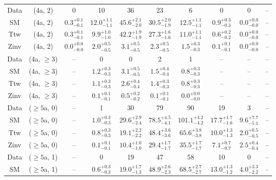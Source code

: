 \begin{table}[h!]
{\begin{tabular}{cccccccccc}
	Data & (4a, 2) & 0 & 10 & 36 & 23 & 6 & 0 & 0 & -- \\[0.5ex] 
	SM & (4a, 2) & $0.3^{+ 0.1 }_{- 0.1 }$ & $12.0^{+ 1.1 }_{- 1.1 }$ & $45.6^{+ 2.1 }_{- 2.0 }$ & $30.5^{+ 2.0 }_{- 1.9 }$ & $12.5^{+ 1.1 }_{- 1.1 }$ & $0.9^{+ 0.3 }_{- 0.3 }$ & $0.0^{+ 0.0 }_{- 0.0 }$ & -- \\[0.5ex] 
	Ttw & (4a, 2) & $0.3^{+ 0.1 }_{- 0.1 }$ & $9.9^{+ 1.0 }_{- 1.0 }$ & $42.2^{+ 1.9 }_{- 1.9 }$ & $27.3^{+ 1.6 }_{- 1.6 }$ & $11.0^{+ 1.1 }_{- 1.1 }$ & $0.6^{+ 0.2 }_{- 0.2 }$ & $0.0^{+ 0.0 }_{- 0.0 }$ & -- \\[0.5ex] 
	Zinv & (4a, 2) & $0.0^{+ 0.0 }_{- 0.0 }$ & $2.0^{+ 0.5 }_{- 0.5 }$ & $3.1^{+ 0.5 }_{- 0.5 }$ & $2.3^{+ 0.5 }_{- 0.5 }$ & $1.5^{+ 0.3 }_{- 0.3 }$ & $0.1^{+ 0.1 }_{- 0.1 }$ & $0.0^{+ 0.0 }_{- 0.0 }$ & -- \\[0.5ex] 
	Data & (4a, $\ge3$) & -- & 0 & 0 & 2 & 1 & -- & -- & -- \\[0.5ex] 
	SM & (4a, $\ge3$) & -- & $1.2^{+ 0.3 }_{- 0.3 }$ & $3.1^{+ 0.5 }_{- 0.5 }$ & $1.5^{+ 0.4 }_{- 0.4 }$ & $0.8^{+ 0.3 }_{- 0.3 }$ & -- & -- & -- \\[0.5ex] 
	Ttw & (4a, $\ge3$) & -- & $1.1^{+ 0.3 }_{- 0.3 }$ & $2.6^{+ 0.4 }_{- 0.4 }$ & $1.4^{+ 0.3 }_{- 0.3 }$ & $0.8^{+ 0.3 }_{- 0.3 }$ & -- & -- & -- \\[0.5ex] 
	Zinv & (4a, $\ge3$) & -- & $0.1^{+ 0.1 }_{- 0.1 }$ & $0.5^{+ 0.2 }_{- 0.2 }$ & $0.1^{+ 0.1 }_{- 0.1 }$ & $0.0^{+ 0.0 }_{- 0.0 }$ & -- & -- & -- \\[0.5ex] 
	Data & ($\ge5$a, 0) & -- & 1 & 30 & 79 & 90 & 19 & 3 & -- \\[0.5ex] 
	SM & ($\ge5$a, 0) & -- & $1.0^{+ 0.3 }_{- 0.3 }$ & $29.6^{+ 2.9 }_{- 2.4 }$ & $78.5^{+ 4.5 }_{- 4.1 }$ & $101.1^{+ 4.2 }_{- 4.2 }$ & $17.7^{+ 1.7 }_{- 1.6 }$ & $9.6^{+ 7.7 }_{- 5.1 }$ & -- \\[0.5ex] 
	Ttw & ($\ge5$a, 0) & -- & $0.8^{+ 0.3 }_{- 0.3 }$ & $19.1^{+ 2.2 }_{- 2.2 }$ & $48.4^{+ 3.6 }_{- 3.6 }$ & $65.6^{+ 3.8 }_{- 3.8 }$ & $10.0^{+ 1.3 }_{- 1.3 }$ & $2.0^{+ 0.5 }_{- 0.5 }$ & -- \\[0.5ex] 
	Zinv & ($\ge5$a, 0) & -- & $0.1^{+ 0.1 }_{- 0.1 }$ & $10.4^{+ 1.0 }_{- 1.0 }$ & $29.4^{+ 1.7 }_{- 1.7 }$ & $35.5^{+ 1.7 }_{- 1.7 }$ & $7.1^{+ 0.7 }_{- 0.7 }$ & $2.5^{+ 0.4 }_{- 0.4 }$ & -- \\[0.5ex] 
	Data & ($\ge5$a, 1) & -- & 0 & 19 & 47 & 58 & 10 & 0 & -- \\[0.5ex] 
	SM & ($\ge5$a, 1) & -- & $0.6^{+ 0.3 }_{- 0.3 }$ & $19.0^{+ 1.7 }_{- 1.3 }$ & $48.9^{+ 2.6 }_{- 2.3 }$ & $68.5^{+ 2.7 }_{- 2.7 }$ & $13.0^{+ 1.3 }_{- 1.2 }$ & $4.0^{+ 3.3 }_{- 2.2 }$ & -- \\[0.5ex] 

\end{tabular}}
\end{table}
